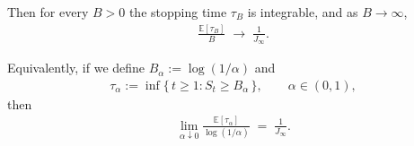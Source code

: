 \begin{theorem}
Then for every $B>0$ the stopping time $\tau_B$ is integrable, and as $B\to\infty$,
\begin{align*}
  \frac{\mathbb{E}[\tau_B]}{B}
  \;\longrightarrow\; \frac{1}{J_\infty}.
\end{align*}

Equivalently, if we define $B_\alpha := \log(1/\alpha)$ and
\begin{align*}
  \tau_\alpha := \inf\{\,t\geq 1 : S_t \geq B_\alpha\,\}, \qquad \alpha\in(0,1),
\end{align*}
then
\begin{align*}
  \lim_{\alpha\downarrow 0}
  \frac{\mathbb{E}[\tau_\alpha]}{\log(1/\alpha)}
  \;=\; \frac{1}{J_\infty}.
\end{align*}
\end{theorem}

